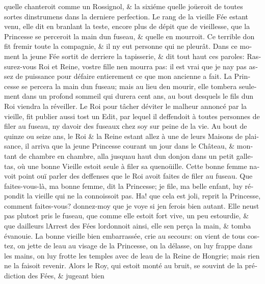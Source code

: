 \documentclass[14pt,a4paper]{memoir}
\begin{document}
{{\begin{otherlanguage}{french}
qu\textquotesingle elle chanteroit comme un Rossignol, \& la sixiéme
qu\textquotesingle elle joüeroit de toutes sortes
d\textquotesingle instrumens dans la derniere perfection. Le rang de la
vieille Fée estant venu, elle dit en branlant la teste, encore plus de
dépit que de vieillesse, que la Princesse se perceroit la main
d\textquotesingle un fuseau, \& qu\textquotesingle elle en mourroit. Ce
terrible don fit fremir toute la compagnie, \& il n\textquotesingle y
eut personne qui ne pleurât. Dans ce moment la jeune Fée sortit de
derriere la tapisserie, \& dit tout haut ces paroles: Rassurez-vous Roi
et Reine, vostre fille n\textquotesingle en mourra pas: il est vrai que
je n\textquotesingle ay pas assez de puissance pour défaire entierement
ce que mon ancienne a fait. La Princesse se percera la main
d\textquotesingle un fuseau; mais au lieu d\textquotesingle en mourir,
elle tombera seulement dans un profond sommeil qui durera cent ans, au
bout desquels le fils d\textquotesingle un Roi viendra la réveiller. Le
Roi pour tâcher d\textquotesingle éviter le malheur annoncé par la
vieille, fit publier aussi tost un Edit, par lequel il deffendoit à
toutes personnes de filer au fuseau, ny d\textquotesingle avoir des
fuseaux chez soy sur peine de la vie. Au bout de quinze ou seize ans, le
Roi \& la Reine estant allez à une de leurs Maisons de plaisance, il
arriva que la jeune Princesse courant un jour dans le Château, \&
montant de chambre en chambre, alla jusqu\textquotesingle au haut
d\textquotesingle un donjon dans un petit galletas, où une bonne Vieille
estoit seule à filer sa quenoüille. Cette bonne femme
n\textquotesingle avoit point ouï parler des deffenses que le Roi avoit
faites de filer au fuseau. Que faites-vous-là, ma bonne femme, dit la
Princesse; je file, ma belle enfant, luy répondit la vieille qui ne la
connoissoit pas. Ha! que cela est joli, reprit la Princesse, comment
faites-vous? donnez-moy que je voye si j\textquotesingle en ferois bien
autant. Elle n\textquotesingle eust pas plutost pris le fuseau, que
comme elle estoit fort vive, un peu estourdie, \& que
d\textquotesingle ailleurs l\textquotesingle Arrest des Fées
l\textquotesingle ordonnoit ainsi, elle s\textquotesingle en perça la
main, \& tomba évanouie. La bonne vieille bien embarrassée, crie au
secours: on vient de tous costez, on jette de l\textquotesingle eau au
visage de la Princesse, on la délasse, on luy frappe dans les mains, on
luy frotte les temples avec de l\textquotesingle eau de la Reine de
Hongrie; mais rien ne la faisoit revenir. Alors le Roy, qui estoit monté
au bruit, se souvint de la prédiction des Fées, \& jugeant bien

\end{otherlanguage}}}
\end{document}
